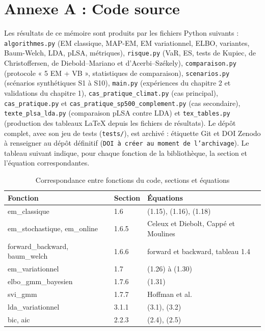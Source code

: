 \section*{Annexe A : Code source}
Les résultats de ce mémoire sont produits par les fichiers Python suivants : \texttt{algorithmes.py} (EM classique, MAP-EM, EM variationnel, ELBO, variantes, Baum-Welch, LDA, pLSA, métriques), \texttt{risque.py} (VaR, ES, tests de Kupiec, de Christoffersen, de Diebold--Mariano et d'Acerbi--Székely), \texttt{comparaison.py} (protocole « 5 EM + VB », statistiques de comparaison), \texttt{scenarios.py} (scénarios synthétiques S1 à S10), \texttt{main.py} (expériences du chapitre 2 et validations du chapitre 1), \texttt{cas\_pratique\_climat.py} (cas principal), \texttt{cas\_pratique.py} et \texttt{cas\_pratique\_sp500\_complement.py} (cas secondaire), \texttt{texte\_plsa\_lda.py} (comparaison pLSA contre LDA) et \texttt{tex\_tables.py} (production des tableaux \LaTeX{} depuis les fichiers de résultats). Le dépôt complet, avec son jeu de tests (\texttt{tests/}), est archivé : étiquette Git et DOI Zenodo à renseigner au dépôt définitif (\texttt{DOI à créer au moment de l'archivage}). Le tableau suivant indique, pour chaque fonction de la bibliothèque, la section et l'équation correspondantes.

\begin{table}[H]
\centering
\small
\setlength{\tabcolsep}{0.14cm}
\begin{tabular}{|p{5.2cm}|p{4.4cm}|p{5.2cm}|}
\hline
\textbf{Fonction} & \textbf{Section} & \textbf{Équations} \\
\hline
em\_classique & 1.6 & (1.15), (1.16), (1.18) \\
\hline
em\_stochastique, em\_online & 1.6.5 & Celeux et Diebolt, Cappé et Moulines \\
\hline
forward\_backward, baum\_welch & 1.6.6 & forward et backward, tableau 1.4 \\
\hline
em\_variationnel & 1.7 & (1.26) à (1.30) \\
\hline
elbo\_gmm\_bayesien & 1.7.6 & (1.31) \\
\hline
svi\_gmm & 1.7.7 & Hoffman et al. \\
\hline
lda\_variationnel & 3.1.1 & (3.1), (3.2) \\
\hline
bic, aic & 2.2.3 & (2.4), (2.5) \\
\hline
\end{tabular}
\caption{Correspondance entre fonctions du code, sections et équations}
\end{table}

